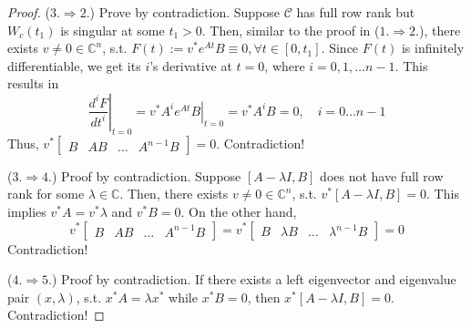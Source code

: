 \documentclass[
]{book}
\theoremstyle{definition}
\theoremstyle{definition}
\theoremstyle{definition}
\theoremstyle{definition}
\theoremstyle{remark}
\begin{document}
\begin{proof}
(\(3. \Rightarrow 2.\)) Prove by contradiction. Suppose \(\mathcal{C}\) has full row rank but \(W_c(t_1)\) is singular at some \(t_1 > 0\). Then, similar to the proof in (\(1. \Rightarrow 2.\)), there exists \(v \ne 0 \in \mathbb{C}^n\), s.t. \(F(t) := v^* e^{At} B \equiv 0, \forall t \in [0, t_1]\). Since \(F(t)\) is infinitely differentiable, we get its \(i\)'s derivative at \(t=0\), where \(i = 0, 1, \dots n-1\). This results in
\begin{equation*}
   \left. \frac{d^i F}{dt^i} \right|_{t=0} = \left. v^* A^{i} e^{At} B \right|_{t=0} = v^* A^i B = 0, \quad i = 0 \dots n-1
\end{equation*}
Thus, \(v^* \begin{bmatrix}  B & AB & \dots & A^{n-1} B \end{bmatrix} = 0\). Contradiction!

(\(3. \Rightarrow 4.\)) Proof by contradiction. Suppose \([A - \lambda I, B]\) does not have full row rank for some \(\lambda \in \mathbb{C}\). Then, there exists \(v \ne 0 \in \mathbb{C}^n\), s.t. \(v^* [A - \lambda I, B] = 0\). This implies \(v^* A = v^* \lambda\) and \(v^* B = 0\). On the other hand,
\begin{equation*}
   v^* \begin{bmatrix}
      B & AB & \dots & A^{n-1}B
   \end{bmatrix} = v^* \begin{bmatrix}
      B & \lambda B & \dots & \lambda^{n-1} B
   \end{bmatrix} = 0
\end{equation*}
Contradiction!

(\(4. \Rightarrow 5.\)) Proof by contradiction. If there exists a left eigenvector and eigenvalue pair \((x, \lambda)\), s.t. \(x^* A = \lambda x^*\) while \(x^*B = 0\), then \(x^* [A - \lambda I, B] = 0\). Contradiction!


\end{proof}
\end{document}
